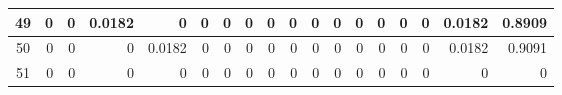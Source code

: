 \begin{table}[ht]
\begin{adjustbox}{width = \textwidth, center}
\begin{tabular}{|c|r|r|r|r|r|r|r|r|r|r|r|r|r|r|r|r|r|}
            \rowcolor[HTML]{FFFFFF} 
            \cellcolor[HTML]{CFE2F3}49                           & 0                                              & 0                                              & \cellcolor[HTML]{C7E9D8}0.0182                 & 0                                              & 0                                              & 0                                              & 0                                              & 0                                               & 0                                               & 0                                               & 0                                               & 0                                               & 0                                               & 0                                               & 0                                               & \cellcolor[HTML]{D9D2E9}0.0182                                                        & \cellcolor[HTML]{D9D2E9}0.8909                                                            \\ \hline
            \rowcolor[HTML]{FFFFFF} 
            \cellcolor[HTML]{CFE2F3}50                           & 0                                              & 0                                              & 0                                              & \cellcolor[HTML]{C7E9D8}0.0182                 & 0                                              & 0                                              & 0                                              & 0                                               & 0                                               & 0                                               & 0                                               & 0                                               & 0                                               & 0                                               & 0                                               & \cellcolor[HTML]{D9D2E9}0.0182                                                        & \cellcolor[HTML]{D9D2E9}0.9091                                                            \\ \hline
            \rowcolor[HTML]{FFFFFF} 
            \cellcolor[HTML]{CFE2F3}51                           & 0                                              & 0                                              & 0                                              & 0                                              & 0                                              & 0                                              & 0                                              & 0                                               & 0                                               & 0                                               & 0                                               & 0                                               & 0                                               & 0                                               & 0                                               & \cellcolor[HTML]{D9D2E9}0                                                             & \cellcolor[HTML]{D9D2E9}0                                                                 \\ \hline

\end{tabular}
\end{adjustbox}
\end{table}
